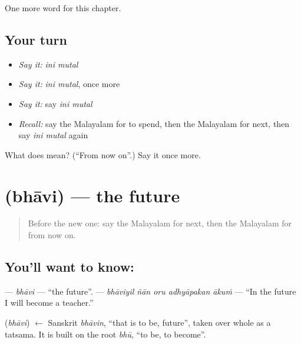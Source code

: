 \begin{grammarlens}[title={What you've built}]
One more word for this chapter.
\end{grammarlens}

\subsection*{Your turn}
\begin{itemize}
\raggedright
  \item \emph{Say it:} \emph{ini mutal}
  \item \emph{Say it:} \emph{ini mutal}, once more
  \item \emph{Say it:} say \emph{ini mutal}
  \item \emph{Recall:} say the Malayalam for to spend, then the Malayalam for next, then say \emph{ini mutal} again
\end{itemize}

\begin{tcolorbox}[breakable,colback=teal!4,colframe=teal!35!black,title={Before you move on}]
What does   mean? (\textquotedblleft{}From now on\textquotedblright{}.) Say it once more.
\end{tcolorbox}
\section[\texorpdfstring{\ml{ഭാവി} (bhāvi)}{ഭാവി (bhāvi)}]{ (bhāvi) — the future}

\label{lesson:ML-C179-bhavi}



\begin{quote}
Before the new one: say the Malayalam for next, then the Malayalam for from now on.
\end{quote}

\subsection*{You'll want to know: }
\textbf{} — \emph{bhāvi} — \textquotedblleft{}the future\textquotedblright{}. \textbf{    } — \emph{bhāviyil ñān oru adhyāpakan ākuṁ} — \textquotedblleft{}In the future I will become a teacher.\textquotedblright{}

\begin{cousinweb}
\textbf{} (\emph{bhāvi}) $\leftarrow$ Sanskrit \emph{bhāvin}, \textquotedblleft{}that is to be, future\textquotedblright{}, taken over whole as a tatsama. It is built on the root \emph{bhū}, \textquotedblleft{}to be, to become\textquotedblright{}.
\end{cousinweb}

